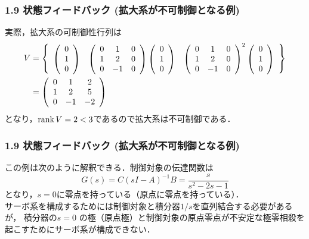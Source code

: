 \begin{frame}[t]
\frametitle{1.9 状態フィードバック (拡大系が不可制御となる例)}
実際，拡大系の可制御性行列は
\begin{align}
 V &=
 \left\{
 \begin{array}{ccc}
 \left(
 \begin{array}{c}
  0 \\
  1 \\
  0
 \end{array}
 \right) &
 \left(
 \begin{array}{ccc}
  0 & 1 & 0 \\
  1 & 2 & 0 \\
  0 & -1 & 0 \\
 \end{array}
 \right)
 \left(
 \begin{array}{c}
  0 \\
  1 \\
  0
 \end{array}
 \right) &
 \left(
 \begin{array}{ccc}
  0 & 1 & 0 \\
  1 & 2 & 0 \\
  0 & -1 & 0 \\
 \end{array}
 \right)^2
 \left(
 \begin{array}{c}
  0 \\
  1 \\
  0
 \end{array}
 \right)
 \end{array}
 \right\} \notag\\ &=
 \left(
 \begin{array}{ccc}
  0 & 1 & 2 \\
  1 & 2 & 5 \\
  0 & -1 & -2 \\
 \end{array}
 \right)\notag
\end{align}
となり，$\mathop{\rm rank}\nolimits V = 2<3$であるので拡大系は不可制御である．\\
\end{frame}


\begin{frame}[t]
\frametitle{1.9 状態フィードバック (拡大系が不可制御となる例)}
この例は次のように解釈できる．制御対象の伝達関数は
\[
 G(s) = C(sI-A)^{-1}B = \frac{s}{s^2-2s-1}
\]
となり，$s=0$に零点を持っている（原点に零点を持っている）．\\
サーボ系を構成するためには制御対象と積分器$1/s$を直列結合する必要があるが，
積分器の$s=0$ の極（原点極）と制御対象の原点零点が不安定な極零相殺を起こすためにサーボ系が構成できない．
\end{frame}


